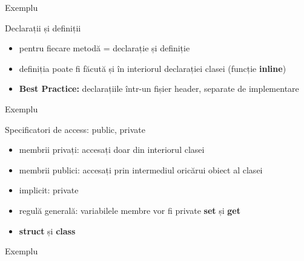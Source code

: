 \documentclass{beamer}
\begin{document}
\begin{frame}{Exemplu}
	\footnotesize{}
\end{frame}

\begin{frame}{Declarații și definiții}
  \begin{itemize}
  \item pentru fiecare metodă = declarație și definiție
  \item definiția poate fi făcută și în interiorul declarației clasei (funcție \textbf{inline})
  \item \textbf{Best Practice:} declarațiile într-un fișier header, separate de implementare
  \end{itemize}
\end{frame}

\begin{frame}{Exemplu}
	\footnotesize{}
\end{frame}

\begin{frame}{Specificatori de access: public, private}
  \begin{itemize}
  \item membrii privați: accesați doar din interiorul clasei
  \item membrii publici: accesați prin intermediul oricărui obiect al clasei
  \item implicit: private
  \item regulă generală: variabilele membre vor fi private  \textbf{set} și \textbf{get} 
  \item \textbf{struct} și \textbf{class}
  \end{itemize}
\end{frame}
               
\begin{frame}{Exemplu}
	\footnotesize{}
\end{frame}
\end{document}
